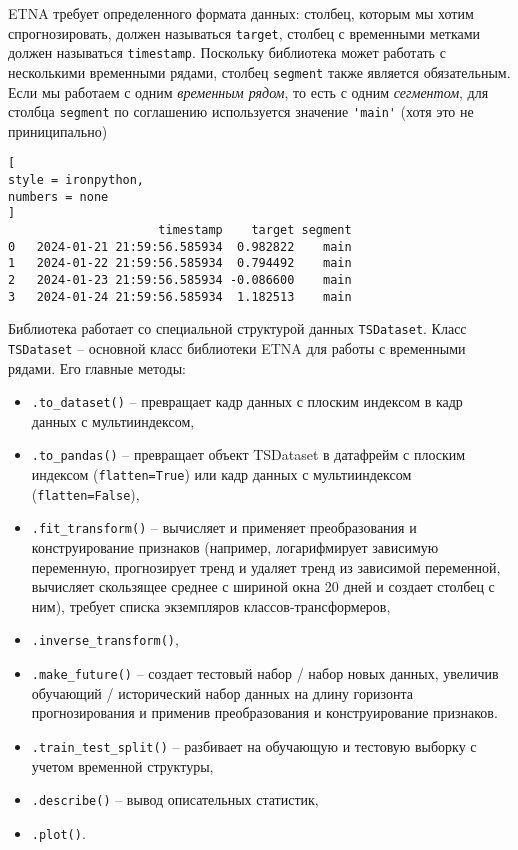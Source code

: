 \documentclass[%
	11pt,
	a4paper,
	utf8,
		]{article}
\begin{document}
ETNA требует определенного формата данных: столбец, которым мы хотим спрогнозировать, должен называться \verb|target|, столбец с временными метками должен называться \verb|timestamp|. Поскольку библиотека может работать с несколькими временными рядами, столбец \verb|segment| также является обязательным. Если мы работаем с одним \emph{временным рядом}, то есть с одним \emph{сегментом}, для столбца \verb|segment| по соглашению используется значение \verb|'main'| (хотя это не приниципально) \cite[]{gruzdev:time-series-2022}
\begin{lstlisting}[
style = ironpython,
numbers = none
]
                     timestamp    target segment
0   2024-01-21 21:59:56.585934  0.982822    main
1   2024-01-22 21:59:56.585934  0.794492    main
2   2024-01-23 21:59:56.585934 -0.086600    main
3   2024-01-24 21:59:56.585934  1.182513    main
\end{lstlisting}

Библиотека работает со специальной структурой данных \verb|TSDataset|. Класс \verb|TSDataset| -- основной класс библиотеки ETNA для работы с временными рядами. Его главные методы:
\begin{itemize}
	\item \verb|.to_dataset()| -- превращает кадр данных с плоским индексом в кадр данных с мультииндексом,
	
	\item \verb|.to_pandas()| -- превращает объект TSDataset в датафрейм с плоским индексом (\verb|flatten=True|) или кадр данных с мультииндексом (\verb|flatten=False|),
	
	\item \verb|.fit_transform()| -- вычисляет и применяет преобразования и конструирование признаков (например, логарифмирует зависимую переменную, прогнозирует тренд и удаляет тренд из зависимой переменной, вычисляет скользящее среднее с шириной окна 20 дней и создает столбец с ним), требует списка экземпляров классов-трансформеров,
	
	\item \verb|.inverse_transform()|,
	
	\item \verb|.make_future()| -- создает тестовый набор / набор новых данных, увеличив обучающий / исторический набор данных на длину горизонта прогнозирования и применив преобразования и конструирование признаков.
	
	\item \verb|.train_test_split()| -- разбивает на обучающую и тестовую выборку с учетом временной структуры,
	
	\item \verb|.describe()| -- вывод описательных статистик,
	
	\item \verb|.plot()|.
\end{itemize}
\end{document}
